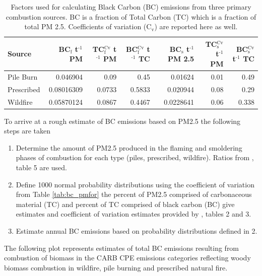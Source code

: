\documentclass[a4paper]{article}
\begin{document}
\begin{table}[htb]
\centering
\begin{tabular}{lrrrrrr}
Source & BC\(_{\text{f}}\) t\(^{\text{-1}}\) PM & TC\(_{\text{f}}^{\text{Cv}}\) t\(^{\text{-1}}\) PM & BC\(_{\text{f}}^{\text{Cv}}\) t\(^{\text{-1}}\) TC & BC\(_{\text{s}}\) t\(^{\text{-1}}\) PM 2.5 & TC\(_{\text{s}}^{\text{Cv}}\) t\(^{\text{-1}}\) PM & BC\(_{\text{s}}^{\text{Cv}}\) t\(^{\text{-1}}\) TC\\
\hline
Pile Burn & 0.046904 & 0.09 & 0.45 & 0.01624 & 0.01 & 0.49\\
Prescribed & 0.08016309 & 0.0733 & 0.5833 & 0.020944 & 0.08 & 0.29\\
Wildfire & 0.05870124 & 0.0867 & 0.4467 & 0.0228641 & 0.06 & 0.338\\
\end{tabular}
\caption{Factors used for calculating Black Carbon (BC) emissions from three primary combustion sources. BC is a fraction of Total Carbon (TC) which is a fraction of total PM 2.5. Coefficients of variation (C\(_{\text{v}}\)) are reported here as well.}

\end{table}



To arrive at a rough estimate of BC emissions based on PM2.5 the
following steps are taken

\begin{enumerate}
\item Determine the amount of PM2.5 produced in the flaming and smoldering
phases of combustion for each type (piles, prescribed,
wildfire). Ratios from \citet{Ward1989}, table 5 are used.
\item Define 1000 normal probability distributions using the coefficient
of variation from Table \ref{tab:bc_pmfor} the percent of PM2.5
comprised of carbonaceous material (TC) and percent of TC comprised
of black carbon (BC) give estimates and coefficient of variation
estimates provided by \citet{Ward1989}, tables 2 and 3.
\item Estimate annual BC emissions based on probability distributions
defined in 2.
\end{enumerate}

The following plot represents estimates of total BC emissions resulting
from combustion of biomass in the CARB CPE emissions categories
reflecting woody biomass combustion in wildfire, pile burning and
prescribed natural fire.
\end{document}
